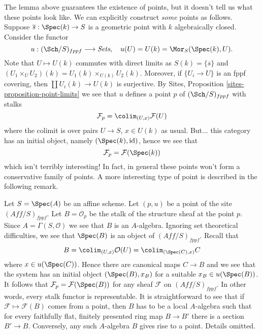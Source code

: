 \noindent
The lemma above guarantees the existence of points, but it doesn't
tell us what these points look like. We can explicitly construct
{\it some} points as follows.
Suppose $\overline{s} : \Spec(k) \to S$ is a geometric
point with $k$ algebraically closed. Consider the functor
$$
u : (\Sch/S)_{fppf} \longrightarrow \textit{Sets},
\quad
u(U) = U(k) = \Mor_S(\Spec(k), U).
$$
Note that $U \mapsto U(k)$ commutes with direct limits as
$S(k) = \{\overline{s}\}$ and
$(U_1 \times_U U_2)(k) = U_1(k) \times_{U(k)} U_2(k)$.
Moreover, if $\{U_i \to U\}$ is an fppf covering, then
$\coprod U_i(k) \to U(k)$ is surjective.
By
Sites, Proposition \ref{sites-proposition-point-limits}
we see that $u$ defines a point $p$ of $(\Sch/S)_{fppf}$ with
stalks
$$
\mathcal{F}_p = \colim_{(U, x)} \mathcal{F}(U)
$$
where the colimit is over pairs $U \to S$, $x \in U(k)$ as usual.
But... this category has an initial object, namely
$(\Spec(k), \text{id})$, hence we see that
$$
\mathcal{F}_p = \mathcal{F}(\Spec(k))
$$
which isn't terribly interesting! In fact, in general these points won't
form a conservative family of points. A more interesting type of point
is described in the following remark.

\begin{remark}
\label{remark-points-fppf-site}
Let $S = \Spec(A)$ be an affine scheme. Let $(p, u)$ be a point of
the site $(\textit{Aff}/S)_{fppf}$. Let $B = \mathcal{O}_p$ be the stalk
of the structure sheaf at the point $p$. Since $A = \Gamma(S, \mathcal{O})$
we see that $B$ is an $A$-algebra. Ignoring set theoretical difficulties, we
see that $\Spec(B)$ is an object of $(\textit{Aff}/S)_{fppf}$. Recall
that
$$
B = \colim_{(U, x)} \mathcal{O}(U) =
\colim_{(\Spec(C), x)} C
$$
where $x \in u(\Spec(C))$. Hence there are canonical maps $C \to B$
and we see that the system has an initial object $(\Spec(B), x_B)$
for a suitable $x_B \in u(\Spec(B))$. It follows that
$\mathcal{F}_p = \mathcal{F}(\Spec(B))$ for any sheaf $\mathcal{F}$
on $(\textit{Aff}/S)_{fppf}$. In other words, every stalk functor
is representable. It is straightforward to see that if
$\mathcal{F} \mapsto \mathcal{F}(B)$ comes from a point, then
$B$ has to be a local $A$-algebra such that for every faithfully flat,
finitely presented ring map $B \to B'$ there is a section $B' \to B$.
Conversely, any such $A$-algebra $B$ gives rise to a point.
Details omitted.
\end{remark}











